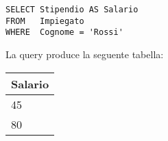 \begin{lstlisting}
SELECT Stipendio AS Salario
FROM   Impiegato
WHERE  Cognome = 'Rossi'
\end{lstlisting}

La query produce la seguente tabella:

\begin{center}
	\begin{tabular}{@{} l @{}}
		\toprule
			Salario \\
		\midrule
			45 \\
			80 \\
		\bottomrule
	\end{tabular}
\end{center}
